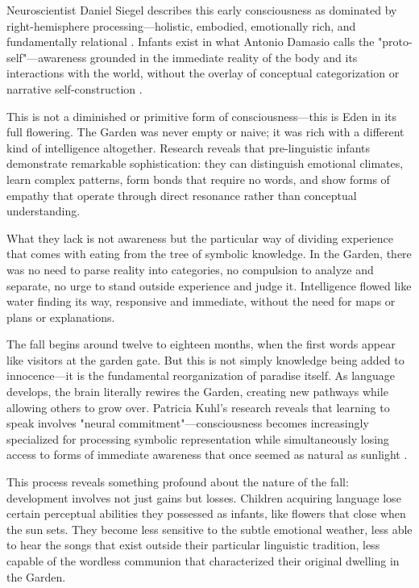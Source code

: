 Neuroscientist Daniel Siegel describes this early consciousness as dominated by right-hemisphere processing—holistic, embodied, emotionally rich, and fundamentally relational \parencite{siegel2012mind}. Infants exist in what Antonio Damasio calls the "proto-self"—awareness grounded in the immediate reality of the body and its interactions with the world, without the overlay of conceptual categorization or narrative self-construction \parencite{damasio1999feeling}.

This is not a diminished or primitive form of consciousness—this is Eden in its full flowering. The Garden was never empty or naive; it was rich with a different kind of intelligence altogether. Research reveals that pre-linguistic infants demonstrate remarkable sophistication: they can distinguish emotional climates, learn complex patterns, form bonds that require no words, and show forms of empathy that operate through direct resonance rather than conceptual understanding.

What they lack is not awareness but the particular way of dividing experience that comes with eating from the tree of symbolic knowledge. In the Garden, there was no need to parse reality into categories, no compulsion to analyze and separate, no urge to stand outside experience and judge it. Intelligence flowed like water finding its way, responsive and immediate, without the need for maps or plans or explanations.

The fall begins around twelve to eighteen months, when the first words appear like visitors at the garden gate. But this is not simply knowledge being added to innocence—it is the fundamental reorganization of paradise itself. As language develops, the brain literally rewires the Garden, creating new pathways while allowing others to grow over. Patricia Kuhl's research reveals that learning to speak involves "neural commitment"—consciousness becomes increasingly specialized for processing symbolic representation while simultaneously losing access to forms of immediate awareness that once seemed as natural as sunlight \parencite{kuhl2004early,kuhl2010brain}.

This process reveals something profound about the nature of the fall: development involves not just gains but losses. Children acquiring language lose certain perceptual abilities they possessed as infants, like flowers that close when the sun sets. They become less sensitive to the subtle emotional weather, less able to hear the songs that exist outside their particular linguistic tradition, less capable of the wordless communion that characterized their original dwelling in the Garden.

